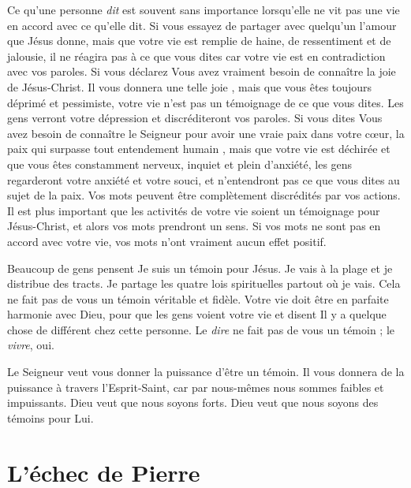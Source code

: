 Ce qu'une personne \emph{dit} est souvent sans importance
 lorsqu'elle ne vit pas une vie en accord avec ce qu'elle dit.
 Si vous essayez de partager avec quelqu'un l'amour que Jésus donne,
 mais que votre vie est remplie de haine, de ressentiment et de jalousie,
 il ne réagira pas à ce que vous dites car votre vie est en contradiction
 avec vos paroles. Si vous déclarez\frcolon{}
 \Og Vous avez vraiment besoin de connaître la joie de Jésus-Christ.
 Il vous donnera une telle joie \Fg{}, mais que vous êtes toujours déprimé
 et pessimiste, votre vie n'est pas un témoignage de ce que vous dites.
 Les gens verront votre dépression et discréditeront vos paroles.
 Si vous dites\frcolon{} \Og Vous avez besoin de connaître le Seigneur pour avoir
 une vraie paix dans votre cœur, la paix qui surpasse
 tout entendement humain \Fg{}, mais que votre vie est déchirée
 et que vous êtes constamment nerveux, inquiet et plein d'anxiété,
 les gens regarderont votre anxiété et votre souci,
 et n'entendront pas ce que vous dites au sujet de la paix.
 Vos mots peuvent être complètement discrédités par vos actions.
 Il est plus important que les activités de votre vie soient
 un témoignage pour Jésus-Christ, et alors vos mots prendront un sens.
 Si vos mots ne sont pas en accord avec votre vie,
 vos mots n'ont vraiment aucun effet positif.

Beaucoup de gens pensent\frcolon{}
 \Og Je suis un témoin pour Jésus. Je vais à la plage
 et je distribue des tracts. Je partage les quatre lois spirituelles
 partout où je vais. \Fg{}
 Cela ne fait pas de vous un témoin véritable et fidèle.
 Votre vie doit être en parfaite harmonie avec Dieu,
 pour que les gens voient votre vie et disent\frcolon{}
 \Og Il y a quelque chose de différent chez cette personne. \Fg{}
 Le \emph{dire} ne fait pas de vous un témoin ; le \emph{vivre}, oui.

Le Seigneur veut vous donner la puissance d'être un témoin.
 Il vous donnera de la puissance à travers l'Esprit-Saint,
 car par nous-mêmes nous sommes faibles et impuissants.
 Dieu veut que nous soyons forts.
 Dieu veut que nous soyons des témoins pour Lui.

\section{L'\'echec de Pierre}

